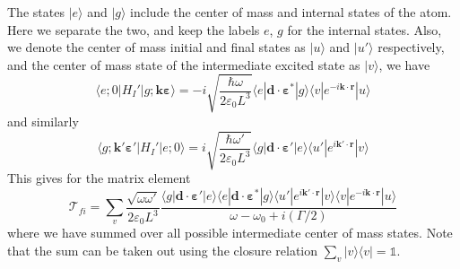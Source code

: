 \documentclass[11pt,letter]{article}
\newcommand{\bv}[1]{\ensuremath{\bm{#1}}}
\begin{document}
The states $|e\rangle$ and $|g\rangle$ include the center of mass and internal
states of the atom.  Here we separate the two, and keep the labels $e$, $g$ for
the internal states. Also, we denote the center of mass initial and final
states as $| u \rangle$ and $|u'\rangle$ respectively, and the center of mass
state of the intermediate excited state as $| v\rangle$, we have
\begin{equation}
   \langle e; 0 | H_{I}' | g; \bv{k}\bv{\varepsilon} \rangle = 
       -i \sqrt{ \frac{ \hbar \omega }{2 \varepsilon_{0} L^{3} }} 
      \langle e | \bv{d} \cdot \bv{\varepsilon}^{*} | g \rangle 
      \langle v | e^{-i\bv{k}\cdot\bv{r}} | u \rangle
\end{equation}
and similarly
\begin{equation}
   \langle g; \bv{k}'\bv{\varepsilon}' | H_{I}' | e; 0\rangle = 
       i \sqrt{ \frac{ \hbar \omega' }{2 \varepsilon_{0} L^{3} }} 
      \langle g | \bv{d} \cdot \bv{\varepsilon}' | e \rangle 
      \langle u' | e^{i\bv{k}'\cdot\bv{r}} | v \rangle
\end{equation}
This gives for the matrix element
\begin{equation}
    \mathcal{T}_{fi} = \sum_{v} \frac{\sqrt{\omega \omega'}}{2\varepsilon_{0} L^{3}}
    \frac{ 
      \langle g | \bv{d} \cdot \bv{\varepsilon}' | e \rangle 
      \langle e | \bv{d} \cdot \bv{\varepsilon}^{*} | g \rangle 
      \langle u'| e^{i\bv{k}'\cdot\bv{r}} | v \rangle 
      \langle v | e^{-i\bv{k}\cdot\bv{r}} | u  \rangle
       }
        { \omega - \omega_{0} + i (\Gamma/2 ) }
\end{equation}
where we have summed over all possible intermediate center of mass states.
Note that the sum can be taken out using the closure relation
$\sum_{v}|v\rangle\langle v| = \mathbb{1}$. 
\end{document}
